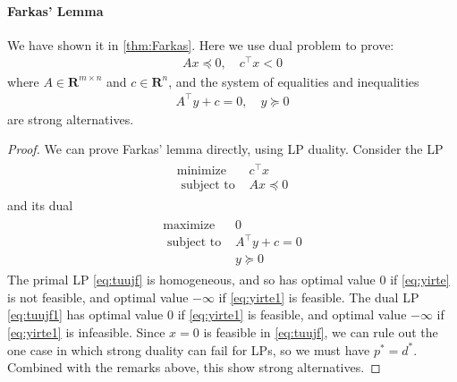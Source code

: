 \documentclass{article}
\begin{document}
\paragraph{Farkas' Lemma}
We have shown it in \cref{thm:Farkas}. Here we use dual problem to prove:
\begin{align}
A x \preceq 0, \quad c^{\top} x<0\label{eq:yirte}
\end{align}
where $A \in \mathbf{R}^{m \times n}$ and $c \in \mathbf{R}^{n}$, and the system of equalities and inequalities
\begin{align}
A^{\top} y+c=0, \quad y \succeq 0\label{eq:yirte1}
\end{align}
are strong alternatives.
\begin{proof}\color{ForestGreen}

We can prove Farkas' lemma directly, using LP duality. Consider the LP
\begin{align}
\begin{array}{ll}
\operatorname{minimize} & c^{\top} x \\
\text { subject to } & A x \preceq 0
\end{array}\label{eq:tuujf}
\end{align}
and its dual
\begin{align}
\begin{array}{ll}
\operatorname{maximize} & 0 \\
\text { subject to } & A^{\top} y+c=0 \\
& y \succeq 0
\end{array}\label{eq:tuujf1}
\end{align}
The primal LP \cref{eq:tuujf} is homogeneous, and so has optimal value 0 if \cref{eq:yirte} is not feasible, and optimal value $-\infty$ if \cref{eq:yirte1} is feasible. The dual LP \cref{eq:tuujf1} has optimal value 0 if \cref{eq:yirte1} is feasible, and optimal value $-\infty$ if \cref{eq:yirte1} is infeasible.
Since $x=0$ is feasible in \cref{eq:tuujf}, we can rule out the one case in which strong duality can fail for LPs, so we must have $p^{* }=d^{* }$. Combined with the remarks above, this show strong alternatives.
\end{proof}



























\end{document}
